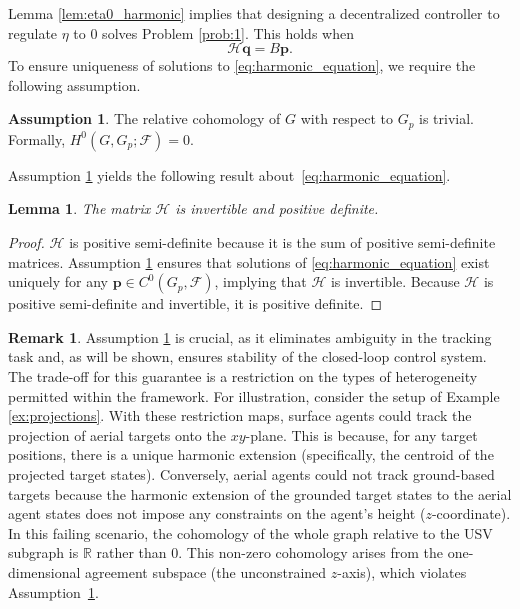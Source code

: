 \documentclass[letterpaper, 10 pt, conference]{ieeeconf}
\newcommand{\R}{\mathbb{R}}
\newcommand{\FF}{\mathcal{F}}
\newtheorem{lemma}{Lemma}
\theoremstyle{definition}
\newtheorem{assumption}{Assumption}
\newtheorem{remark}{Remark}
\begin{document}
Lemma \ref{lem:eta0_harmonic} implies that designing a decentralized controller to regulate $\eta$ to 0 solves Problem \ref{prob:1}. This holds when 
\begin{equation}\label{eq:harmonic_equation}
    \mathcal{H}\mathbf{q} = B\mathbf{p}.
\end{equation}
To ensure uniqueness of solutions to \eqref{eq:harmonic_equation}, we require the following assumption.

\begin{assumption}\label{as:relative_cohom}
    The relative cohomology of $G$ with respect to $G_p$ is trivial. Formally, $H^0(G, G_p;\FF) = 0$.
\end{assumption}

Assumption \ref{as:relative_cohom} yields the following result about~\eqref{eq:harmonic_equation}.
\begin{lemma}
    The matrix $\mathcal{H}$ is invertible and positive definite.
\end{lemma}
\begin{proof}
    $\mathcal{H}$ is positive semi-definite because it is the sum of positive semi-definite matrices. Assumption \ref{as:relative_cohom} ensures that solutions of \eqref{eq:harmonic_equation} exist uniquely for any $\mathbf{p}\in C^0(G_p,\FF)$, implying that $\mathcal{H}$ is invertible. Because $\mathcal{H}$ is positive semi-definite and invertible, it is positive definite.
\end{proof}

\begin{remark}
    Assumption \ref{as:relative_cohom} is crucial, as it eliminates ambiguity in the tracking task and, as will be shown, ensures stability of the closed-loop control system. The trade-off for this guarantee is a restriction on the types of heterogeneity permitted within the framework. For illustration, consider the setup of Example \ref{ex:projections}. With these restriction maps, surface agents could track the projection of aerial targets onto the $xy$-plane. This is because, for any target positions, there is a unique harmonic extension (specifically, the centroid of the projected target states). Conversely, aerial agents could not track ground-based targets because the harmonic extension of the grounded target states to the aerial agent states does not impose any constraints on the agent's height ($z$-coordinate). In this failing scenario, the cohomology of the whole graph relative to the USV subgraph is $\R$ rather than $0$. This non-zero cohomology arises from the one-dimensional agreement subspace (the unconstrained $z$-axis), which violates Assumption~\ref{as:relative_cohom}.
\end{remark}
\end{document}
